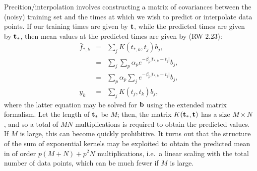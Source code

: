 \documentclass[manuscript, letterpaper]{aastex6}
\begin{document}
Precition/interpolation involves constructing a matrix of covariances
between the (noisy) training set and the times at which we wish to
predict or interpolate data points.   If our training times are given by
${\bf t}$, while the predicted times are given by ${\bf t}_*$, then
mean values at the predicted times are given by (RW 2.23):
\begin{eqnarray}
\bar f_{*,k} &=& \sum_j K(t_{*,k},t_j) b_j,\\
&=& \sum_j \sum_p \alpha_p e^{-\beta_p \vert t_{*,k}-t_j\vert} b_j,\\
&=& \sum_p \alpha_p \sum_j e^{-\beta_p \vert t_{*,k}-t_j\vert} b_j,\\
y_k &=& \sum_j K(t_j,t_k) b_j,
\end{eqnarray}
where the latter equation may be solved for ${\bf b}$ using the extended
matrix formalism.  Let the length of ${\bf t}_*$ be $M$; then, the
matrix $K({\bf t}_*,{\bf t})$ has a size $M \times N$, and so a total
of $MN$ multiplications is required to obtain the predicted values.
If $M$ is large, this can become quickly prohibitive.  It turns out
that the structure of the sum of exponential kernels may be exploited
to obtain the predicted mean in of order $p(M+N)+p^2N$ multiplications,
i.e.\ a linear scaling with the total number of data points, which can
be much fewer if $M$ is large.
\end{document}
